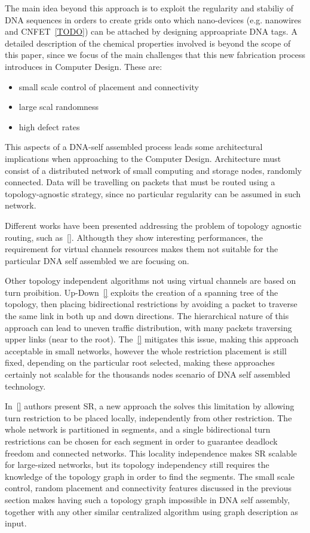 \documentclass[conference]{IEEEtran}
\begin{document}
The main idea beyond this approach is to exploit the regularity and
stabiliy of DNA sequences in orders to create grids onto which
nano-devices (e.g. nanowires and CNFET~\ref{TODO}) can be attached by
designing approapriate DNA tags. A detailed description of the
chemical properties involved is beyond the scope of this paper, since
we focus of the main challenges that this new fabrication process
introduces in Computer Design. These are:
\begin{itemize}
\item small scale control of placement and connectivity
\item large scal randomness
\item high defect rates
\end{itemize}


This aspects of a DNA-self assembled process leads some architectural implications
when approaching to the Computer Design. Architecture must consist of
a distributed network of small computing and storage nodes, randomly
connected. Data will be travelling on packets that must be routed
using a topology-agnostic strategy, since no particular regularity can
be assumed in such network. 

Different works have been presented addressing the problem of topology
agnostic routing, such as~\ref{}. Althougth they show interesting
performances, the requirement for virtual channels resources makes
them not suitable for the particular DNA self assembled we are
focusing on. 

Other topology independent algorithms not using virtual channels are
based on turn proibition. Up-Down~\ref{} exploits the creation of a
spanning tree of the topology, then placing bidirectional restrictions
by avoiding a packet to traverse the same link in both up and down
directions. The hierarchical nature of this approach can lead to
uneven traffic distribution, with many packets traversing upper links
(near to the root). The~\ref{} mitigates this issue, making this
approach acceptable in small networks, however the whole restriction
placement is still fixed, depending on the particular root selected,
making these approaches certainly not scalable for the thousands nodes
scenario of DNA self assembled technology.

In~\ref{} authors present SR, a new approach the solves this limitation by
allowing turn restriction to be placed locally, independently from
other restriction. The whole network is partitioned in segments, and a
single bidirectional turn restrictions can be chosen for each
segment in order to guarantee deadlock freedom and connected networks.
This locality independence makes SR scalable for large-sized networks,
but its topology independency still requires the knowledge of the
topology graph in order to find the segments. The small scale control,
random placement and connectivity features discussed in the previous
section makes having such a topology graph impossible in DNA
self assembly, together with any other similar centralized algorithm using
graph description as input.
\end{document}
